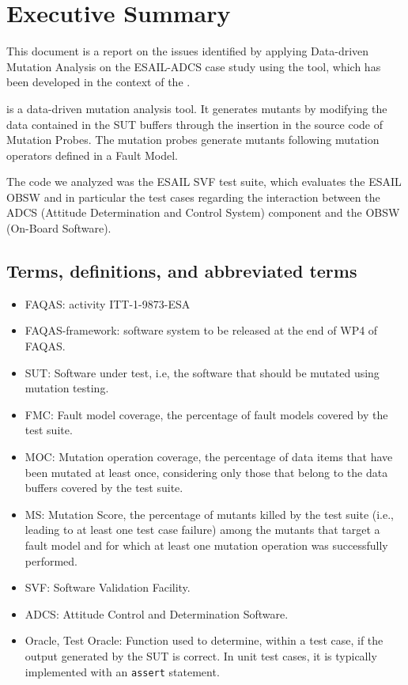 
\chapter{Executive Summary}

This document is a report on the issues identified by applying Data-driven Mutation Analysis on the ESAIL-ADCS case study using the \DAMA tool, which has been developed in the context of the \FAQAS.

\DAMA is a data-driven mutation analysis tool. It generates mutants by modifying the data contained in the SUT buffers through the insertion in the source code of Mutation Probes. The mutation probes generate mutants following mutation operators defined in a Fault Model.

The code we analyzed was the ESAIL SVF test suite, which evaluates the ESAIL OBSW and in particular the test cases regarding the interaction between the ADCS (Attitude Determination and Control System) component and the OBSW (On-Board Software).


\section{Terms, definitions, and abbreviated terms}

\begin{itemize}
\item{FAQAS}: activity ITT-1-9873-ESA
\item{FAQAS-framework}: software system to be released at the end of WP4 of FAQAS.
\item{SUT}: Software under test, i.e, the software that should be mutated using mutation testing.
\item{FMC}: Fault model coverage, the percentage of fault models covered by the test suite.
\item{MOC}: Mutation operation coverage, the percentage of data items that have been mutated at least once, considering only those that belong to the data buffers covered by the test suite.
\item{MS}: Mutation Score, the percentage of mutants killed by the test suite (i.e., leading to at least one test case failure) among the mutants that target a fault model and for which at least one mutation operation was successfully performed.
\item{SVF}: Software Validation Facility.
\item{ADCS}: Attitude Control and Determination Software.
\item{Oracle, Test Oracle}: Function used to determine, within a test case, if the output generated by
the SUT is correct. In unit test cases, it is typically implemented with an \texttt{assert} statement.

\end{itemize}

\clearpage
